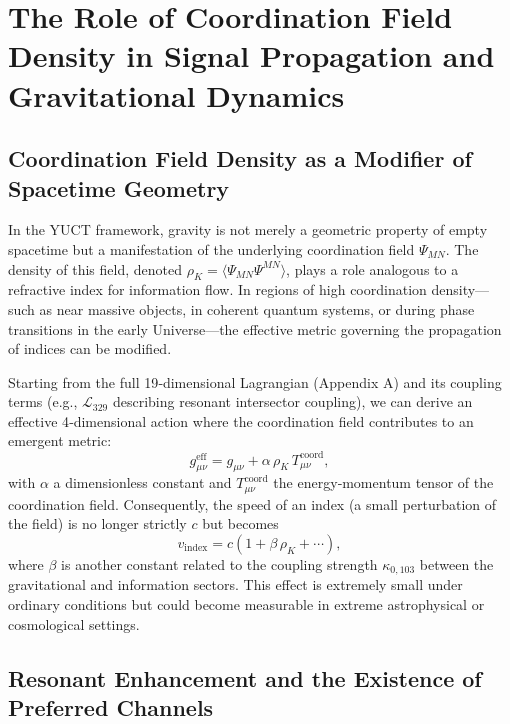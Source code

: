 \documentclass[12pt,a4paper]{article}
\begin{document}
	\section{The Role of Coordination Field Density in Signal Propagation and Gravitational Dynamics}
	\label{sec:coord-density}
	
	\subsection{Coordination Field Density as a Modifier of Spacetime Geometry}
	
	In the YUCT framework, gravity is not merely a geometric property of empty spacetime but a manifestation of the underlying coordination field \(\Psi_{MN}\). The density of this field, denoted \(\rho_K = \langle \Psi_{MN}\Psi^{MN} \rangle\), plays a role analogous to a refractive index for information flow. In regions of high coordination density—such as near massive objects, in coherent quantum systems, or during phase transitions in the early Universe—the effective metric governing the propagation of indices can be modified.
	
	Starting from the full 19‑dimensional Lagrangian (Appendix A) and its coupling terms (e.g., \(\mathcal{L}_{329}\) describing resonant intersector coupling), we can derive an effective 4‑dimensional action where the coordination field contributes to an emergent metric:
	\begin{equation}
		g_{\mu\nu}^{\mathrm{eff}} = g_{\mu\nu} + \alpha \, \rho_K \, T_{\mu\nu}^{\mathrm{coord}},
	\end{equation}
	with \(\alpha\) a dimensionless constant and \(T_{\mu\nu}^{\mathrm{coord}}\) the energy‑momentum tensor of the coordination field. Consequently, the speed of an index (a small perturbation of the field) is no longer strictly \(c\) but becomes
	\begin{equation}
		v_{\mathrm{index}} = c \left(1 + \beta \, \rho_K + \cdots \right),
	\end{equation}
	where \(\beta\) is another constant related to the coupling strength \(\kappa_{0,103}\) between the gravitational and information sectors. This effect is extremely small under ordinary conditions but could become measurable in extreme astrophysical or cosmological settings.
	
	\subsection{Resonant Enhancement and the Existence of Preferred Channels}
	
\end{document}
